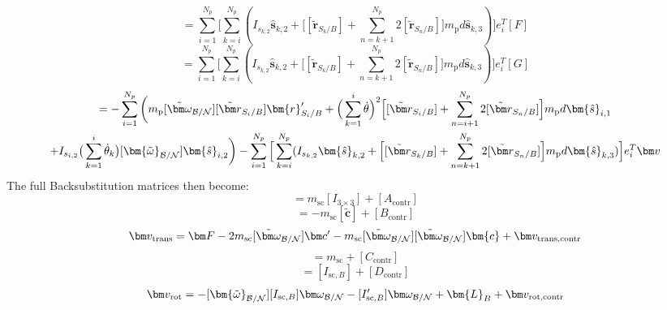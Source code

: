\begin{equation}
	[C_{\text{contr}}] = \sum\limits_{i=1}^{N_p} \Big[\sum^{N_p}_{k=i} (I_{s_{k,2}} \bm{\hat{s}}_{k,2} + \Big[ [\tilde{{\bm r}}_{S_{k}/B}] + \sum\limits_{n=k+1}^{N_p}2[\tilde{{\bm r}}_{S_{n}/B}]\Big]m_{\text{p}} d \bm{\hat{s}}_{k,3} ) \Big]e_{i}^T[F]
\end{equation}
\begin{equation}
	[D_{\text{contr}}] = \sum\limits_{i=1}^{N_p} \Big[\sum^{N_p}_{k=i} (I_{s_{k,2}} \bm{\hat{s}}_{k,2} + \Big[ [\tilde{{\bm r}}_{S_{k}/B}] + \sum\limits_{n=k+1}^{N_p}2[\tilde{{\bm r}}_{S_{n}/B}]\Big]m_{\text{p}} d \bm{\hat{s}}_{k,3} )\Big] e_{i}^T[G]
\end{equation}
\begin{multline}
	[v_{\text{rot,contr}}] = - \sum\limits_{i=1}^{N_p}\bigg( m_{\text{p}} [\tilde{\bm\omega}_{\cal B/N}] [\tilde{{\bm r}}_{S_{i}/B}] \bm{r}'_{S_i/B} + \Big( \sum\limits_{k=1}^{i} \dot{\theta}\Big)^2 \Big[[\tilde{{\bm r}}_{S_{i}/B}] + \sum\limits_{n=i+1}^{N_p}2[\tilde{{\bm r}}_{S_{n}/B}]\Big] m_{\text{p}} d \bm{\hat{s}}_{i,1}\\
	+ I_{s_{i,2}} \big(\sum^{i}_{k=1}\dot{\theta}_k\big) [\bm{\tilde{\omega}}_{\cal B/N}] \bm{\hat{s}}_{i,2} \bigg)
	- \sum\limits_{i=1}^{N_p} \Big[\sum^{N_p}_{k=i} (I_{s_{k,2}} \bm{\hat{s}}_{k,2} + \Big[ [\tilde{{\bm r}}_{S_{k}/B}] + \sum\limits_{n=k+1}^{N_p}2[\tilde{{\bm r}}_{S_{n}/B}]\Big]m_{\text{p}} d \bm{\hat{s}}_{k,3} )\Big]  e_{i}^T \bm v
\end{multline}
The full Backsubstitution matrices then become:
\begin{equation}
	[A]  = m_\text{sc} [I_{3\times 3}] + [A_{\text{contr}}]
\end{equation}\begin{equation}
	[B] = -m_\text{sc} [\tilde{\bm{c}}] + [B_{\text{contr}}]
\end{equation}\begin{equation}
	\bm v_{\text{trans}} = \bm F - 2m_\text{sc} [\tilde{\bm\omega}_{\cal B/N}] \bm c'- m_\text{sc} [\tilde{\bm\omega}_{\cal B/N}][\tilde{\bm\omega}_{\cal B/N}]\bm{c} + \bm v_{\text{trans,contr}}
\end{equation}\begin{equation}
	[C] = m_{\text{sc}} + [C_{\text{contr}}]
\end{equation}\begin{equation}
	[D] =  [I_{\text{sc},B}] + [D_{\text{contr}}]
\end{equation}\begin{equation}
	\bm v_{\text{rot}} = -[\bm{\tilde{\omega}}_{\cal B/N}] [I_{\text{sc},B}] \bm\omega_{\cal B/N} - [I'_{\text{sc},B}] \bm\omega_{\cal B/N} + \bm{L}_B + \bm v_{\text{rot,contr}}
\end{equation}


